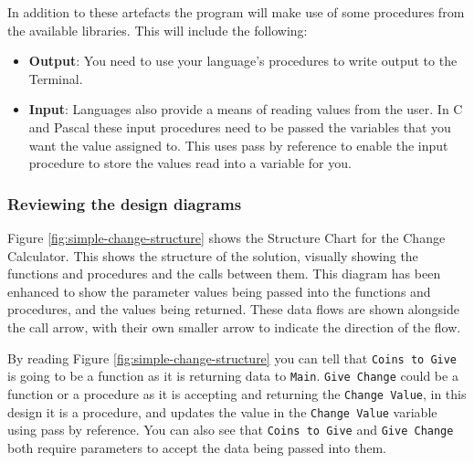 In addition to these artefacts the program will make use of some procedures from the available libraries. This will include the following:
\begin{itemize}
  \item \textbf{Output}: You need to use your language's procedures to write output to the Terminal.
  \item \textbf{Input}: Languages also provide a means of reading values from the user. In C and Pascal these input procedures need to be passed the variables that you want the value assigned to. This uses pass by reference to enable the input procedure to store the values read into a variable for you.
\end{itemize}




\subsubsection{Reviewing the design diagrams} %
\label{ssub:reviewing_the_design_diagrams}

Figure \ref{fig:simple-change-structure} shows the Structure Chart for the Change Calculator. This shows the structure of the solution, visually showing the functions and procedures and the calls between them. This diagram has been enhanced to show the parameter values being passed into the functions and procedures, and the values being returned. These data flows are shown alongside the call arrow, with their own smaller arrow to indicate the direction of the flow. 

By reading Figure \ref{fig:simple-change-structure} you can tell that \texttt{Coins to Give} is going to be a function as it is returning data to \texttt{Main}. \texttt{Give Change} could be a function or a procedure as it is accepting and returning the \texttt{Change Value}, in this design it is a procedure, and updates the value in the \texttt{Change Value} variable using pass by reference. You can also see that \texttt{Coins to Give} and \texttt{Give Change} both require parameters to accept the data being passed into them. 

